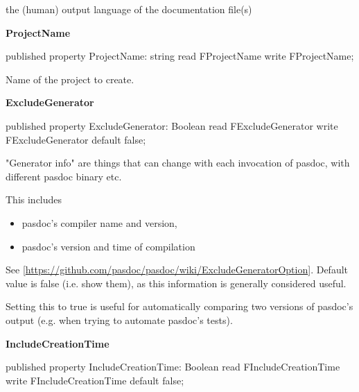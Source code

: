 \documentclass{report}
\newif\ifpdf
\begin{document}
\begin{list}{}
\begin{flushleft}
\ifpdf
\end{flushleft}
\fi


\par the (human) output language of the documentation file(s)\label{PasDoc_Gen.TDocGenerator-ProjectName}
\item[\textbf{ProjectName}\hfill]
\ifpdf
\begin{flushleft}
\fi
\begin{ttfamily}
published property ProjectName: string read FProjectName write FProjectName;\end{ttfamily}

\ifpdf
\end{flushleft}
\fi


\par Name of the project to create.\label{PasDoc_Gen.TDocGenerator-ExcludeGenerator}
\item[\textbf{ExcludeGenerator}\hfill]
\ifpdf
\begin{flushleft}
\fi
\begin{ttfamily}
published property ExcludeGenerator: Boolean
      read FExcludeGenerator write FExcludeGenerator default false;\end{ttfamily}

\ifpdf
\end{flushleft}
\fi


\par "Generator info" are things that can change with each invocation of pasdoc, with different pasdoc binary etc.

This includes \begin{itemize}
\item pasdoc's compiler name and version,
\item pasdoc's version and time of compilation
\end{itemize} See [\href{https://github.com/pasdoc/pasdoc/wiki/ExcludeGeneratorOption}{https://github.com/pasdoc/pasdoc/wiki/ExcludeGeneratorOption}]. Default value is false (i.e. show them), as this information is generally considered useful.

Setting this to true is useful for automatically comparing two versions of pasdoc's output (e.g. when trying to automate pasdoc's tests).\label{PasDoc_Gen.TDocGenerator-IncludeCreationTime}
\item[\textbf{IncludeCreationTime}\hfill]
\ifpdf
\begin{flushleft}
\fi
\begin{ttfamily}
published property IncludeCreationTime: Boolean
      read FIncludeCreationTime write FIncludeCreationTime default false;\end{ttfamily}


\end{flushleft}
\end{list}
\end{document}
